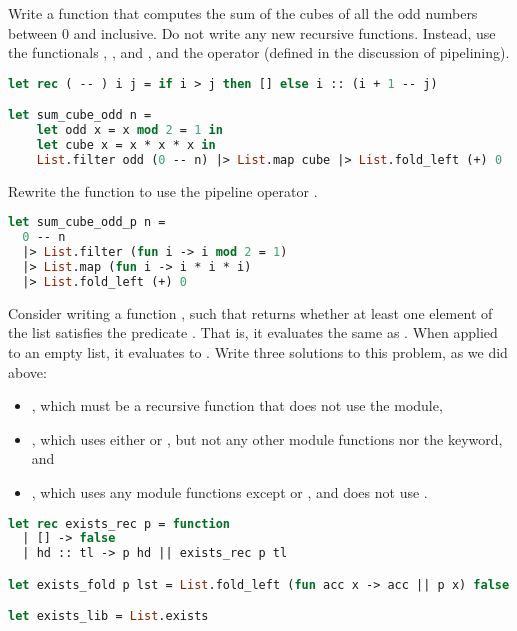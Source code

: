 Write a function  that computes the sum of the cubes of all the odd numbers between 0 and  inclusive. Do not write any new recursive functions. Instead, use the functionals , , and , and the \code{( -- )} operator (defined in the discussion of pipelining).

\begin{lstlisting}[language=OCaml]
let rec ( -- ) i j = if i > j then [] else i :: (i + 1 -- j)

let sum_cube_odd n =
	let odd x = x mod 2 = 1 in
	let cube x = x * x * x in
	List.filter odd (0 -- n) |> List.map cube |> List.fold_left (+) 0
\end{lstlisting}

Rewrite the function  to use the pipeline operator \code{|>}.

\begin{lstlisting}[language=OCaml]
let sum_cube_odd_p n =
  0 -- n
  |> List.filter (fun i -> i mod 2 = 1)
  |> List.map (fun i -> i * i * i)
  |> List.fold_left (+) 0
\end{lstlisting}

\problem[exists]
Consider writing a function , such that  returns whether at least one element of the list satisfies the predicate . That is, it evaluates the same as . When applied to an empty list, it evaluates to .
Write three solutions to this problem, as we did above:
\begin{itemize}
  \item {}, which must be a recursive function that does not use the  module,
  \item {}, which uses either  or , but not any other  module functions nor the  keyword, and
  \item {}, which uses any  module functions except  or , and does not use .
\end{itemize}

\begin{lstlisting}[language=OCaml]
let rec exists_rec p = function
  | [] -> false
  | hd :: tl -> p hd || exists_rec p tl

let exists_fold p lst = List.fold_left (fun acc x -> acc || p x) false lst

let exists_lib = List.exists
\end{lstlisting}

